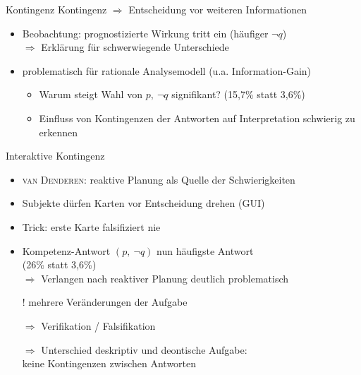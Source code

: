 \begin{frame}{Kontingenz {\scriptsize \cite[S.~105,109]{stenningHumanReasoningCognitive2008}}}
    Kontingenz $\Rightarrow$ Entscheidung vor weiteren Informationen
    \begin{itemize}
        \item Beobachtung: prognostizierte Wirkung tritt ein {\small (häufiger $\lnot q$)} \\
            $\Rightarrow$ Erklärung für schwerwiegende Unterschiede
        
        \item problematisch für rationale Analysemodell {\small (u.a. Information-Gain)}
        \begin{itemize}
            \item Warum steigt Wahl von $p,~\lnot q$ signifikant? (15,7\% statt 3,6\%)
            \item Einfluss von Kontingenzen der Antworten auf Interpretation schwierig zu erkennen
        \end{itemize}
    \end{itemize}
\end{frame}


\begin{frame}{Interaktive Kontingenz {\scriptsize \cite[S.~105,109]{stenningHumanReasoningCognitive2008}}}
    \begin{itemize}
        \item \textsc{van Denderen}: reaktive Planung als Quelle der Schwierigkeiten
        \item Subjekte dürfen Karten vor Entscheidung drehen (GUI)
        \item Trick: erste Karte falsifiziert nie
        
        \pause
        \item Kompetenz-Antwort $(p,~\lnot q)$ nun häufigste Antwort \\
        (26\% statt 3,6\%) \\
        $\Rightarrow$ Verlangen nach reaktiver Planung deutlich problematisch
        
        \item[!] mehrere Veränderungen der Aufgabe
        \item[$\Rightarrow$] Verifikation / Falsifikation
        \item[$\Rightarrow$] Unterschied deskriptiv und deontische Aufgabe:\\
            keine Kontingenzen zwischen Antworten
    \end{itemize}
\end{frame}


